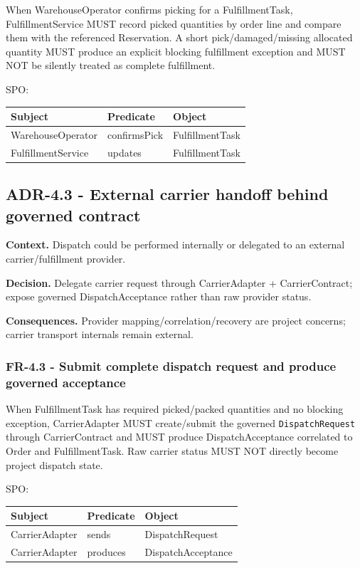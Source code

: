 \documentclass[
  10pt,
]{article}
\begin{document}
When WarehouseOperator confirms picking for a FulfillmentTask,
FulfillmentService MUST record picked quantities by order line and
compare them with the referenced Reservation. A short
pick/damaged/missing allocated quantity MUST produce an explicit
blocking fulfillment exception and MUST NOT be silently treated as
complete fulfillment.

SPO:

\begin{longtable}[]{@{}lll@{}}
\toprule\noalign{}
Subject & Predicate & Object \\
\midrule\noalign{}
\endhead
\bottomrule\noalign{}
\endlastfoot
WarehouseOperator & confirmsPick & FulfillmentTask \\
FulfillmentService & updates & FulfillmentTask \\
\end{longtable}

\subsection{ADR-4.3 - External carrier handoff behind governed
contract}\label{adr-43---external-carrier-handoff-behind-governed-contract}

\textbf{Context.} Dispatch could be performed internally or delegated to
an external carrier/fulfillment provider.

\textbf{Decision.} Delegate carrier request through CarrierAdapter +
CarrierContract; expose governed DispatchAcceptance rather than raw
provider status.

\textbf{Consequences.} Provider mapping/correlation/recovery are project
concerns; carrier transport internals remain external.

\subsubsection{FR-4.3 - Submit complete dispatch request and produce
governed
acceptance}\label{fr-43---submit-complete-dispatch-request-and-produce-governed-acceptance}

When FulfillmentTask has required picked/packed quantities and no
blocking exception, CarrierAdapter MUST create/submit the governed
\texttt{DispatchRequest} through CarrierContract and MUST produce
DispatchAcceptance correlated to Order and FulfillmentTask. Raw carrier
status MUST NOT directly become project dispatch state.

SPO:

\begin{longtable}[]{@{}lll@{}}
\toprule\noalign{}
Subject & Predicate & Object \\
\midrule\noalign{}
\endhead
\bottomrule\noalign{}
\endlastfoot
CarrierAdapter & sends & DispatchRequest \\
CarrierAdapter & produces & DispatchAcceptance \\
\end{longtable}
\end{document}

